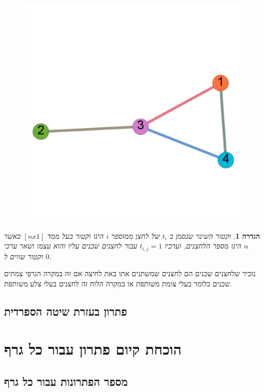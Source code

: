 \documentclass[12pt,twoside]{article}
\newtheorem{definition}{הגדרה}[section]
\begin{document}
\begin{figure}[ht]
    \caption{}
    \label{fig:numbering_graph}
    \unsethebrew
    \centering
    \includegraphics[width=.7\textwidth,height=.7\textheight,keepaspectratio]{images/numbering_graph.PNG}
\end{figure}
\sethebrew

\begin{definition}
    וקטור השינוי
    שנסמן ב
    $t_i$
    של לחצן
    ממוספר
    $i$
    הינו וקטור בעל ממד
    $[n x 1]$
    כאשר 
    $n$
    הינו מספר הלחצנים,
    וערכיו
    $t_{i,j} = 1$
    עבור לחצנים
    שכנים עליו והוא עצמו
    ושאר ערכי וקטור שווים ל
    $0$.

\end{definition}

נזכיר שלחצנים שכנים הם לחצנים שמשתנים אתו באת לחיצה 
אם זה במקרה הגרפי צמתים שכנים כלומר בעלי צומת משותפת
או במקרה הלוח זה לחצנים בעלי צלע משותפת.





\subsection{פתרון בעזרת שיטה הספרדית}

\section{הוכחת  קיום פתרון עבור כל גרף}

\subsection{מספר הפתרונות עבור כל גרף}
\end{document}
